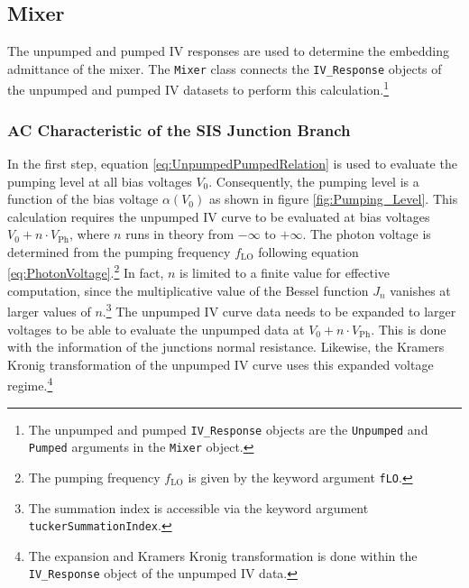 \documentclass[]{article}
\begin{document}
\subsection{Mixer}\label{sec:Mixer}
The unpumped and pumped IV responses are used to determine the embedding admittance of the mixer. The \texttt{Mixer} class connects the \texttt{IV\_Response} objects of the unpumped and pumped IV datasets to perform this calculation.\footnote{The unpumped and pumped \texttt{IV\_Response} objects are the \texttt{Unpumped} and \texttt{Pumped} arguments in the \texttt{Mixer} object.}

\subsubsection{AC Characteristic of the SIS Junction Branch}
In the first step, equation \ref{eq:UnpumpedPumpedRelation} is used to evaluate the pumping level at all bias voltages $V_0$. Consequently, the pumping level is a function of the bias voltage $\alpha(V_0)$ as shown in figure \ref{fig:Pumping_Level}. This calculation requires the unpumped IV curve to be evaluated at bias voltages $V_0+n\cdot V_\text{Ph}$, where $n$ runs in theory from $-\infty$ to $+\infty$. The photon voltage is determined from the pumping frequency $f_\text{LO}$ following equation \ref{eq:PhotonVoltage}.\footnote{The pumping frequency $f_\text{LO}$ is given by the keyword argument \texttt{fLO}.} In fact, $n$ is limited to a finite value for effective computation, since the multiplicative value of the Bessel function $J_n$ vanishes at larger values of $n$.\footnote{The summation index is accessible via the keyword argument \texttt{tuckerSummationIndex}.} The unpumped IV curve data needs to be expanded to larger voltages to be able to evaluate the unpumped data at $V_0+n\cdot V_\text{Ph}$. This is done with the information of the junctions normal resistance. Likewise, the Kramers Kronig transformation of the unpumped IV curve uses this expanded voltage regime.\footnote{The expansion and Kramers Kronig transformation is done within the \texttt{IV\_Response} object of the unpumped IV data.}
\end{document}
